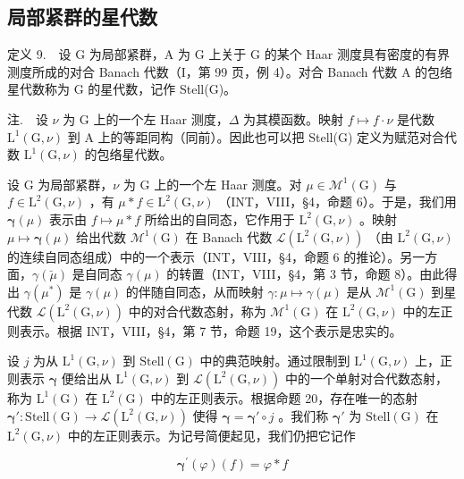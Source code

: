 \subsection{局部紧群的星代数}

定义 9.　设 G 为局部紧群，A 为 G 上关于 G 的某个 Haar 测度具有密度的有界测度所成的对合 Banach 代数（I，第 99 页，例 4）。对合 Banach 代数 A 的包络星代数称为 G 的星代数，记作 Stell(G)。

注.　设 \(\nu\) 为 G 上的一个左 Haar 测度，\(\Delta\) 为其模函数。映射 \(f \mapsto f \cdot \nu\) 是代数 \(\mathrm{L}^{1}(\mathrm{G}, \nu)\) 到 A 上的等距同构（同前）。因此也可以把 Stell(G) 定义为赋范对合代数 \(\mathrm{L}^{1}(\mathrm{G}, \nu)\) 的包络星代数。

设 G 为局部紧群，\(\nu\) 为 G 上的一个左 Haar 测度。对 \(\mu \in \mathcal{M}^1 (\mathrm{G})\) 与 \(f\in \mathrm{L}^2 (\mathrm{G},\nu)\) ，有 \(\mu *f\in \mathrm{L}^2 (\mathrm{G},\nu)\) （INT，VIII，§4，命题 6）。于是，我们用 \(\pmb{\gamma}(\mu)\) 表示由 \(f\mapsto \mu *f\) 所给出的自同态，它作用于 \(\mathrm{L}^2 (\mathrm{G},\nu)\) 。映射 \(\mu \mapsto \pmb{\gamma}(\mu)\) 给出代数 \(\mathcal{M}^{1}(\mathrm{G})\) 在 Banach 代数 \(\mathcal{L}(\mathrm{L}^{2}(\mathrm{G},\nu))\) （由 \(\mathrm{L}^2 (\mathrm{G},\nu)\) 的连续自同态组成）中的一个表示（INT，VIII，§4，命题 6 的推论）。另一方面，\(\gamma (\breve{\mu})\) 是自同态 \(\gamma (\mu)\) 的转置（INT，VIII，§4，第 3 节，命题 8）。由此得出 \(\gamma (\mu^{*})\) 是 \(\gamma (\mu)\) 的伴随自同态，从而映射 \(\gamma \colon \mu \mapsto \gamma (\mu)\) 是从 \(\mathcal{M}^{1}(\mathrm{G})\) 到星代数 \(\mathcal{L}(\mathrm{L}^{2}(\mathrm{G},\nu))\) 中的对合代数态射，称为 \(\mathcal{M}^{1}(\mathrm{G})\) 在 \(\mathrm{L}^2 (\mathrm{G},\nu)\) 中的左正则表示。根据 INT，VIII，§4，第 7 节，命题 19，这个表示是忠实的。

设 \(j\) 为从 \(\mathrm{L}^{1}(\mathrm{G},\nu)\) 到 \(\mathrm{Stell}(\mathrm{G})\) 中的典范映射。通过限制到 \(\mathrm{L}^{1}(\mathrm{G},\nu)\) 上，正则表示 \(\pmb{\gamma}\) 便给出从 \(\mathrm{L}^{1}(\mathrm{G},\nu)\) 到 \(\mathcal{L}(\mathrm{L}^{2}(\mathrm{G},\nu))\) 中的一个单射对合代数态射，称为 \(\mathrm{L}^{1}(\mathrm{G})\) 在 \(\mathrm{L}^{2}(\mathrm{G})\) 中的左正则表示。根据命题 20，存在唯一的态射 \(\pmb{\gamma}'\colon \mathrm{Stell}(\mathrm{G})\to \mathcal{L}(\mathrm{L}^{2}(\mathrm{G},\nu))\) 使得 \(\pmb{\gamma} = \pmb{\gamma}'\circ j\) 。我们称 \(\pmb{\gamma}'\) 为 \(\mathrm{Stell}(\mathrm{G})\) 在 \(\mathrm{L}^{2}(\mathrm{G},\nu)\) 中的左正则表示。为记号简便起见，我们仍把它记作

\[
\boldsymbol {\gamma} ^ {\prime} (\varphi) (f) = \varphi * f\tag{7}
\]

